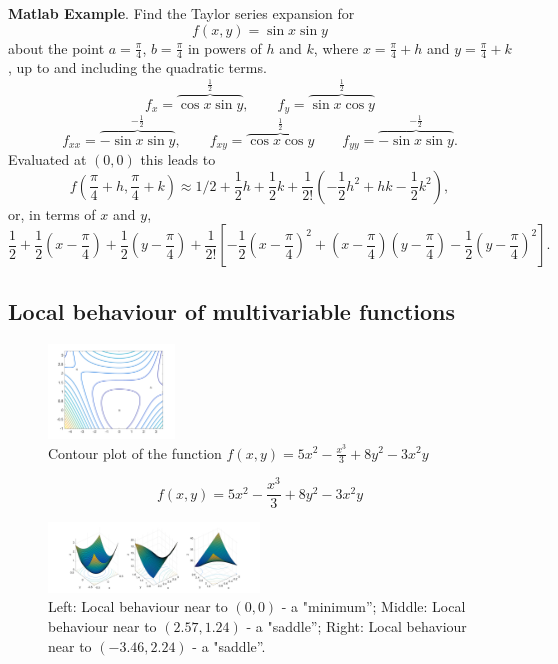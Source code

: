 \documentclass{article}
\begin{document}
\textbf{Matlab Example}.  Find the Taylor series expansion for
{\small
$$
f(x,y) = \sin x \sin y
$$ 
}
about the point $a=\frac{\pi}{4}$, $b=\frac{\pi}{4}$
in powers of $h$ and $k$, where $x=\frac{\pi}{4}+h$ and $y=\frac{\pi}{4}+k$, up to
and including the quadratic terms.
{\small 
$$
f_x = \overbrace{\cos x \sin y}^{\frac{1}{2}}, \qquad f_y = \overbrace{\sin x \cos y}^{\frac{1}{2}}
$$
}
{\small
$$
f_{xx} =\overbrace{-\sin x \sin y}^{-\frac{1}{2}},\qquad f_{xy} = \overbrace{\cos x \cos y}^{\frac{1}{2}}\qquad
f_{yy}=\overbrace{-\sin x \sin y}^{-\frac{1}{2}}.
$$
}
Evaluated at $(0,0)$ this leads to
{\small
$$
f(\frac{\pi}{4}+h,\frac{\pi}{4}+k)\approx 1/2 + \frac{1}{2} h +
\frac{1}{2}k + \frac{1}{2!} \left( -\frac{1}{2} h^2  + hk  -
\frac{1}{2} k^2 \right),
$$
}
or, in terms of $x$ and $y$,
{\small
$$
\frac{1}{2} + \frac{1}{2} (x-\frac{\pi}{4}) +
\frac{1}{2}(y-\frac{\pi}{4}) + \frac{1}{2!} \left[ -\frac{1}{2} (x-\frac{\pi}{4})^2  + (x-\frac{\pi}{4})(y-\frac{\pi}{4})  -
\frac{1}{2} (y-\frac{\pi}{4})^2 \right].
$$
}


\subsection{Local behaviour of multivariable functions}

\begin{figure}[!ht]
\vspace{-.2cm}
\centering
\includegraphics[width = 0.3\textwidth]{Contour_plot_min_saddle.pdf}%
\caption{Contour plot of the function $f(x,y)=5x^2-\frac{x^3}{3}+8y^2-3x^2y$}
\end{figure}


$$
f(x,y)=5x^2-\frac{x^3}{3}+8y^2-3x^2y
$$
\begin{figure}[!ht]
\vspace{-.5cm}
\centering
\includegraphics[width = 0.5\textwidth]{Local_min_saddle.pdf}%
\caption{Left: Local behaviour near to $(0,0)$ - a "minimum''; Middle: Local behaviour near to $(2.57, 1.24)$ - a "saddle''; Right: Local behaviour near to $(-3.46, 2.24)$ - a "saddle''.}
\end{figure}
\end{document}
